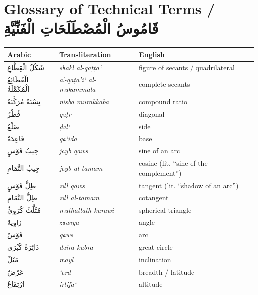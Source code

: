 \documentclass[11pt,a4paper]{article}
\theoremstyle{plain}
\theoremstyle{definition}
\theoremstyle{remark}
\newcommand{\ar}[1]{{\arabicfont\beginR #1\endR}}
\begin{document}
\clearpage

\section*{Glossary of Technical Terms / \ar{قَامُوسُ الْمُصْطَلَحَاتِ الْفَنِّيَّةِ}}

\begin{center}
\begin{longtable}{lll}
\toprule
\textbf{Arabic} & \textbf{Transliteration} & \textbf{English} \\
\midrule
\endhead

\ar{شَكْلُ الْقِطَّاعِ} & \textit{shakl al-qa\d{t}\d{t}a`} & figure of secants / quadrilateral \\
\ar{الْقَطَائِعُ الْمُكَمَّلَةُ} & \textit{al-qa\d{t}a'i` al-mukammala} & complete secants \\
\ar{نِسْبَةٌ مُرَكَّبَةٌ} & \textit{nisba murakkaba} & compound ratio \\
\ar{قُطْرٌ} & \textit{qu\d{t}r} & diagonal \\
\ar{ضَلْعٌ} & \textit{\d{d}al`} & side \\
\ar{قَاعِدَةٌ} & \textit{qa`ida} & base \\
\ar{جِيبُ قَوْسٍ} & \textit{jayb qaws} & sine of an arc \\
\ar{جِيبُ التَّمَامِ} & \textit{jayb al-tamam} & cosine (lit. ``sine of the complement'') \\
\ar{ظِلُّ قَوْسٍ} & \textit{zill qaws} & tangent (lit. ``shadow of an arc'') \\
\ar{ظِلُّ التَّمَامِ} & \textit{zill al-tamam} & cotangent \\
\ar{مُثَلَّثٌ كُرَوِيٌّ} & \textit{muthallath kurawi} & spherical triangle \\
\ar{زَاوِيَةٌ} & \textit{zawiya} & angle \\
\ar{قَوْسٌ} & \textit{qaws} & arc \\
\ar{دَائِرَةٌ كُبْرَى} & \textit{daira kubra} & great circle \\
\ar{مَيْلٌ} & \textit{mayl} & inclination \\
\ar{عَرْضٌ} & \textit{`ard} & breadth / latitude \\
\ar{ارْتِفَاعٌ} & \textit{irtifa`} & altitude \\

\bottomrule
\end{longtable}
\end{center}
\end{document}
